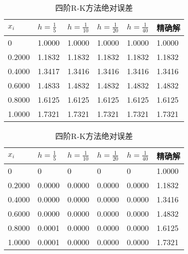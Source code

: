 \documentclass[12pt, a4paper, oneside]{ctexart}
\begin{document}

\begin{table}[h] %
    \centering
    \footnotesize
    \begin{minipage}[t]{0.48\textwidth}\centering
    \begin{tabular}{@{}llllll@{}}
        \toprule
        $x_i$      & $h=\frac{1}{5}$  & $h=\frac{1}{10}$ & $h=\frac{1}{20}$ & $h=\frac{1}{40}$ & 精确解    \\ \midrule 
        0      & 1.0000 & 1.0000 & 1.0000 & 1.0000 & 1.0000 \\
        0.2000 & 1.1832 & 1.1832 & 1.1832 & 1.1832 & 1.1832 \\
        0.4000 & 1.3417 & 1.3416 & 1.3416 & 1.3416 & 1.3416 \\
        0.6000 & 1.4833 & 1.4832 & 1.4832 & 1.4832 & 1.4832 \\
        0.8000 & 1.6125 & 1.6125 & 1.6125 & 1.6125 & 1.6125 \\
        1.0000 & 1.7321 & 1.7321 & 1.7321 & 1.7321 & 1.7321 \\ \bottomrule
        \end{tabular}
	\caption{四阶R-K方法计算结果} \label{fig:rk41}
    \end{minipage}
    \begin{minipage}[t]{0.48\textwidth}\centering
    \begin{tabular}{@{}llllll@{}}
        \toprule
        $x_i$      & $h=\frac{1}{5}$  & $h=\frac{1}{10}$ & $h=\frac{1}{20}$ & $h=\frac{1}{40}$ & 精确解    \\ \midrule 
        0      & 0      & 0      & 0      & 0      & 1.0000 \\
        0.2000 & 0.0000 & 0.0000 & 0.0000 & 0.0000 & 1.1832 \\
        0.4000 & 0.0000 & 0.0000 & 0.0000 & 0.0000 & 1.3416 \\
        0.6000 & 0.0000 & 0.0000 & 0.0000 & 0.0000 & 1.4832 \\
        0.8000 & 0.0001 & 0.0000 & 0.0000 & 0.0000 & 1.6125 \\
        1.0000 & 0.0001 & 0.0000 & 0.0000 & 0.0000 & 1.7321 \\ \bottomrule
        \end{tabular}
	\caption{四阶R-K方法绝对误差} \label{fig:rk42}
    \end{minipage}
\end{table}
\end{document}
